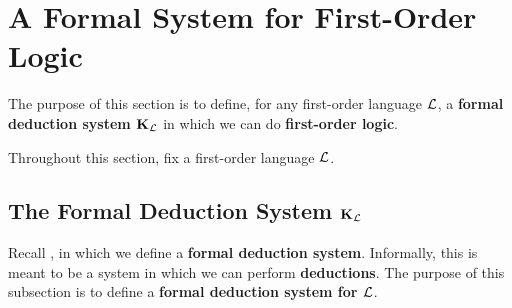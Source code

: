 \section{A Formal System for First-Order Logic}

The purpose of this section is to define, for any first-order language $\mathcal{L}$, a \textbf{formal deduction system $\mathbf{K}_{\mathcal{L}}$} in which we can do \textbf{first-order logic}.

Throughout this section, fix a first-order language $\mathcal{L}$.

\subsection{The Formal Deduction System $\mathbf{K}_{\mathcal{L}}$}

Recall , in which we define a \textbf{formal deduction system}. Informally, this is meant to be a system in which we can perform \textbf{deductions}. The purpose of this subsection is to define a \textbf{formal deduction system for $\mathcal{L}$}.

